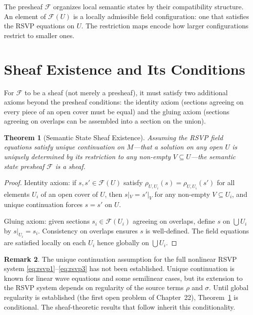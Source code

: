 \documentclass[12pt, oneside]{book}
\theoremstyle{flyxion}
\newtheorem{theorem}{Theorem}[chapter]
\theoremstyle{definition}
\newtheorem{remark}[theorem]{Remark}
\begin{document}
The presheaf $\mathcal{F}$ organizes local semantic
states by their compatibility structure. An element of
$\mathcal{F}(U)$ is a locally admissible field
configuration: one that satisfies the RSVP equations
on $U$. The restriction maps encode how larger
configurations restrict to smaller ones.

\section{Sheaf Existence and Its Conditions}

For $\mathcal{F}$ to be a sheaf (not merely a presheaf),
it must satisfy two additional axioms beyond the presheaf
conditions: the identity axiom (sections agreeing on
every piece of an open cover must be equal) and the
gluing axiom (sections agreeing on overlaps can be
assembled into a section on the union).

\begin{theorem}[Semantic State Sheaf Existence]
\label{thm:sheaf_existence}
Assuming the RSVP field equations satisfy unique
continuation on $M$---that a solution on any open
$U$ is uniquely determined by its restriction to any
non-empty $V \subseteq U$---the semantic state presheaf
$\mathcal{F}$ is a sheaf.
\end{theorem}

\begin{proof}
Identity axiom: if $s, s' \in \mathcal{F}(U)$ satisfy
$\rho_{U,U_i}(s) = \rho_{U,U_i}(s')$ for all elements
$U_i$ of an open cover of $U$, then $s|_V = s'|_V$ for
any non-empty $V \subseteq U_i$, and unique continuation
forces $s = s'$ on $U$.

Gluing axiom: given sections $s_i \in \mathcal{F}(U_i)$
agreeing on overlaps, define $s$ on $\bigcup U_i$ by
$s|_{U_i} = s_i$. Consistency on overlaps ensures
$s$ is well-defined. The field equations are satisfied
locally on each $U_i$ hence globally on $\bigcup U_i$.
\end{proof}

\begin{remark}
The unique continuation assumption for the full
nonlinear RSVP system \eqref{eq:rsvp1}--\eqref{eq:rsvp3}
has not been established. Unique continuation is known
for linear wave equations and some semilinear cases, but
its extension to the RSVP system depends on regularity
of the source terms $\rho$ and $\sigma$. Until global
regularity is established (the first open problem of
Chapter~22), Theorem~\ref{thm:sheaf_existence} is
conditional. The sheaf-theoretic results that follow
inherit this conditionality.
\end{remark}
\end{document}
